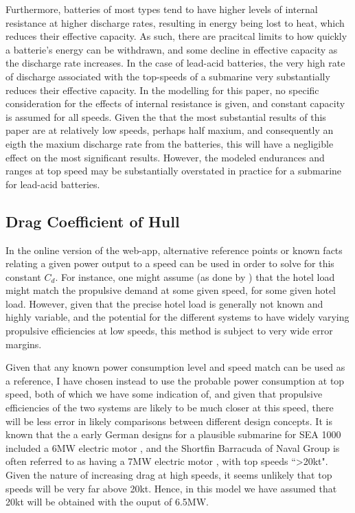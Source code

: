 \documentclass{article}\usepackage[]{graphicx}\usepackage[]{color}
\begin{document}
Furthermore, batteries of most types tend to have higher levels of internal resistance at higher discharge rates, resulting in energy being lost to heat, which reduces their effective capacity.  As such, there are pracitcal limits to how quickly a batterie's energy can be withdrawn, and some decline in effective capacity as the discharge rate increases.  In the case of lead-acid batteries, the very high rate of discharge associated with the top-speeds of a submarine very substantially reduces their effective capacity.  In the modelling for this paper, no specific consideration for the effects of internal resistance is given, and constant capacity is assumed for all speeds.  Given the that the most substantial results of this paper are at relatively low speeds, perhaps half maxium, and consequently an eigth the maxium discharge rate from the batteries, this will have a negligible effect on the most significant results.  However, the modeled endurances and ranges at top speed may be substantially overstated in practice for a submarine for lead-acid batteries.

\subsection{Drag Coefficient of Hull}

In the online version of the web-app, alternative reference points or known facts relating a given power output to a speed can be used in order to solve for this constant $C_d$.  For instance, one might assume (as done by \cite{davies2017}) that the hotel load might match the propulsive demand at some given speed, for some given hotel load.  However, given that the precise hotel load is generally not known and highly variable, and the potential for the different systems to have widely varying propulsive efficiencies at low speeds, this method is subject to very wide error margins.

Given that any known power consumption level and speed match can be used as a reference, I have chosen instead to use the probable power consumption at top speed, both of which we have some indication of, and given that propulsive efficiencies of the two systems are likely to be much closer at this speed, there will be less error in likely comparisons between different design concepts.  It is known that the a early German designs for a plausible submarine for SEA 1000 included a 6MW electric motor \parencite{patrick2012}, and the Shortfin Barracuda of Naval Group is often referred to as having a 7MW electric motor \parencite{ohff2017} \parencite{coates2016}, with top speeds ``>20kt".  Given the nature of increasing drag at high speeds, it seems unlikely that top speeds will be very far above 20kt. Hence, in this model we have assumed that 20kt will be obtained with the ouput of 6.5MW.
\end{document}
